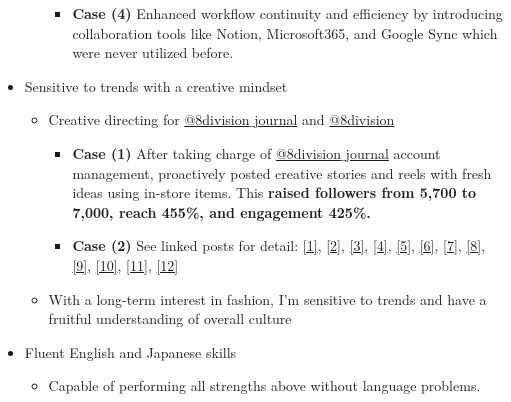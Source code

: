 \documentclass[a4paper,10pt]{extarticle}
\begin{document}
\begin{itemize}
\begin{itemize}
\begin{itemize}
			            \item \textbf{Case (4)} Enhanced workflow continuity and efficiency by introducing collaboration tools like Notion, Microsoft365, and Google Sync which were never utilized before.
		            \end{itemize}
	      \end{itemize}
	\item Sensitive to trends with a creative mindset
	      \begin{itemize}
		      \item Creative directing for \href{https://instagram.com/8division_journal}{@8division$\_$journal} and \href{https://instagram.com/8division}{@8division}
		            \begin{itemize}
			            \item \textbf{Case (1)} After taking charge of \href{https://instagram.com/8division_journal}{@8division$\_$journal} account management, proactively posted creative stories and reels with fresh ideas using in-store items. This \textbf{raised followers from 5,700 to 7,000, reach 455\%, and engagement 425\%.}
			            \item \textbf{Case (2)} See linked posts for detail: \href{https://www.instagram.com/p/C7a1jATpnJX/?utm_source=ig_web_copy_link&igsh=MzRlODBiNWFlZA==}{[1]}, \href{https://www.instagram.com/reel/C7n3bSAOFLr/?utm_source=ig_web_copy_link&igsh=MzRlODBiNWFlZA==}{[2]}, \href{https://www.instagram.com/p/C78w_W-uIC8/?utm_source=ig_web_copy_link&igsh=MzRlODBiNWFlZA==}{[3]}, \href{https://www.instagram.com/reel/C8Jo9gOpoTv/?utm_source=ig_web_copy_link&igsh=MzRlODBiNWFlZA==}{[4]}, \href{https://www.instagram.com/reel/C9EObQVp6FI/?utm_source=ig_web_copy_link&igsh=MzRlODBiNWFlZA==}{[5]}, \href{https://www.instagram.com/reel/C9Wx7SzJpDl/?utm_source=ig_web_copy_link&igsh=MzRlODBiNWFlZA==}{[6]}, \href{https://www.instagram.com/reel/C-zD8a3JmS3/?utm_source=ig_web_copy_link&igsh=MzRlODBiNWFlZA==}{[7]}, \href{https://www.instagram.com/reel/C_FrXrnp88r/?utm_source=ig_web_copy_link&igsh=MzRlODBiNWFlZA==}{[8]}, \href{https://www.instagram.com/reel/C_kkBM4pjrZ/?utm_source=ig_web_copy_link&igsh=MzRlODBiNWFlZA==}{[9]}, \href{https://www.instagram.com/reel/DA-fgFRShaJ/?utm_source=ig_web_copy_link&igsh=MzRlODBiNWFlZA==}{[10]}, \href{https://www.instagram.com/reel/DBBXdejJ-3k/?utm_source=ig_web_copy_link&igsh=MzRlODBiNWFlZA==}{[11]}, \href{https://www.instagram.com/reel/DBS9XOmp9-t/?utm_source=ig_web_copy_link&igsh=MzRlODBiNWFlZA==}{[12]}
		            \end{itemize}
		      \item With a long-term interest in fashion, I'm sensitive to trends and have a fruitful understanding of overall culture
	      \end{itemize}
	\item Fluent English and Japanese skills
	      \begin{itemize}
		      \item Capable of performing all strengths above without language problems.
	      \end{itemize}
\end{itemize}
\end{document}

